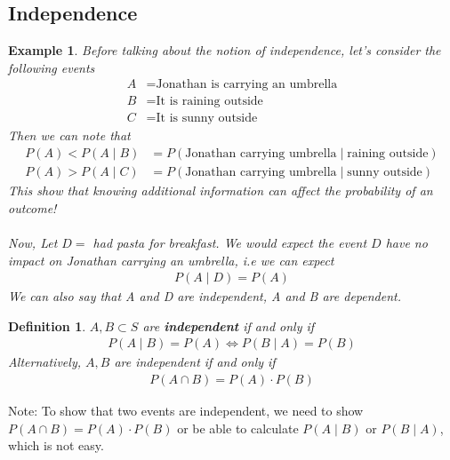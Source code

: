 \documentclass[11pt,oneside]{book}
\theoremstyle{newStyle}
\newtheorem{defn}[thm]{Definition}
\newtheorem{ex}{Example}[section]
\newcommand{\note}{\color{red}Note: \color{black}}
\begin{document}
\subsection[Independence]{Independence}
\begin{ex}
Before talking about the notion of independence, let's consider the following events \begin{align*}
A&=\text{Jonathan is carrying an umbrella}\\
B&=\text{It is raining outside}\\
C&=\text{It is sunny outside}
\end{align*}
Then we can note that \begin{align*}
P(A)<P(A\mid B)&=P(\text{Jonathan carrying umbrella}\mid \text{raining outside})\\
P(A)>P(A\mid C)&=P(\text{Jonathan carrying umbrella}\mid \text{sunny outside})
\end{align*}
This show that knowing additional information can affect the probability of an outcome!\\
\hfill\\
Now, Let $D=$ had pasta for breakfast. We would expect the event $D$ have no impact on Jonathan carrying an umbrella, i.e we can expect \begin{align*}
P(A\mid D)=P(A)
\end{align*}
We can also say that A and D are independent, A and B are dependent.
\end{ex}
\begin{defn}
$A,B\subset S$ are \textbf{independent} if and only if \begin{align*}
P(A\mid B)=P(A) \iff P(B\mid A)=P(B)
\end{align*}
Alternatively, $A,B$ are independent if and only if \begin{align*}
P(A\cap B)=P(A)\cdot P(B)
\end{align*}
\end{defn}
\note To show that two events are independent, we need to show  $P(A\cap B)=P(A)\cdot P(B)$  or be able to calculate $P(A\mid B)$ or $P(B\mid A)$, which is not easy.\\
\end{document}
